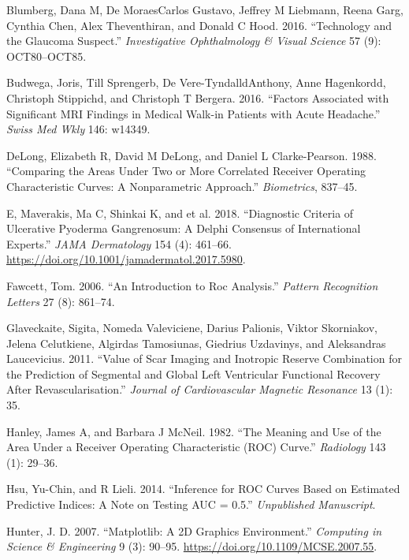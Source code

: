 \documentclass[smallextended]{svjour3}       %
\begin{document}
\leavevmode\hypertarget{ref-blumberg2016technology}{}%
Blumberg, Dana M, De MoraesCarlos Gustavo, Jeffrey M Liebmann, Reena
Garg, Cynthia Chen, Alex Theventhiran, and Donald C Hood. 2016.
``Technology and the Glaucoma Suspect.'' \emph{Investigative
Ophthalmology \& Visual Science} 57 (9): OCT80--OCT85.

\leavevmode\hypertarget{ref-budwega2016factors}{}%
Budwega, Joris, Till Sprengerb, De Vere-TyndalldAnthony, Anne
Hagenkordd, Christoph Stippichd, and Christoph T Bergera. 2016.
``Factors Associated with Significant MRI Findings in Medical Walk-in
Patients with Acute Headache.'' \emph{Swiss Med Wkly} 146: w14349.

\leavevmode\hypertarget{ref-delong}{}%
DeLong, Elizabeth R, David M DeLong, and Daniel L Clarke-Pearson. 1988.
``Comparing the Areas Under Two or More Correlated Receiver Operating
Characteristic Curves: A Nonparametric Approach.'' \emph{Biometrics},
837--45.

\leavevmode\hypertarget{ref-jama}{}%
E, Maverakis, Ma C, Shinkai K, and et al. 2018. ``Diagnostic Criteria of
Ulcerative Pyoderma Gangrenosum: A Delphi Consensus of International
Experts.'' \emph{JAMA Dermatology} 154 (4): 461--66.
\url{https://doi.org/10.1001/jamadermatol.2017.5980}.

\leavevmode\hypertarget{ref-fawcett2006introduction}{}%
Fawcett, Tom. 2006. ``An Introduction to Roc Analysis.'' \emph{Pattern
Recognition Letters} 27 (8): 861--74.

\leavevmode\hypertarget{ref-glaveckaite2011value}{}%
Glaveckaite, Sigita, Nomeda Valeviciene, Darius Palionis, Viktor
Skorniakov, Jelena Celutkiene, Algirdas Tamosiunas, Giedrius Uzdavinys,
and Aleksandras Laucevicius. 2011. ``Value of Scar Imaging and Inotropic
Reserve Combination for the Prediction of Segmental and Global Left
Ventricular Functional Recovery After Revascularisation.'' \emph{Journal
of Cardiovascular Magnetic Resonance} 13 (1): 35.

\leavevmode\hypertarget{ref-hanley1982meaning}{}%
Hanley, James A, and Barbara J McNeil. 1982. ``The Meaning and Use of
the Area Under a Receiver Operating Characteristic (ROC) Curve.''
\emph{Radiology} 143 (1): 29--36.

\leavevmode\hypertarget{ref-hsu2014inference}{}%
Hsu, Yu-Chin, and R Lieli. 2014. ``Inference for ROC Curves Based on
Estimated Predictive Indices: A Note on Testing AUC = 0.5.''
\emph{Unpublished Manuscript}.

\leavevmode\hypertarget{ref-matplotlib}{}%
Hunter, J. D. 2007. ``Matplotlib: A 2D Graphics Environment.''
\emph{Computing in Science \& Engineering} 9 (3): 90--95.
\url{https://doi.org/10.1109/MCSE.2007.55}.
\end{document}
